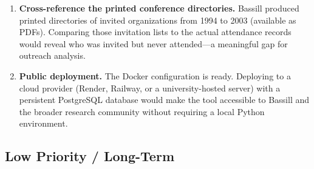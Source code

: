 \documentclass[12pt]{article}
\begin{document}
\begin{enumerate}[leftmargin=1.5em]
  \item \textbf{Cross-reference the printed conference directories.}
        Bassill produced printed directories of invited organizations from
        1994 to 2003 (available as PDFs). Comparing those invitation lists
        to the actual attendance records would reveal who was invited but
        never attended---a meaningful gap for outreach analysis.

  \item \textbf{Public deployment.}
        The Docker configuration is ready. Deploying to a cloud provider
        (Render, Railway, or a university-hosted server) with a persistent
        PostgreSQL database would make the tool accessible to Bassill and the
        broader research community without requiring a local Python environment.
\end{enumerate}

\subsection{Low Priority / Long-Term}
\end{document}

